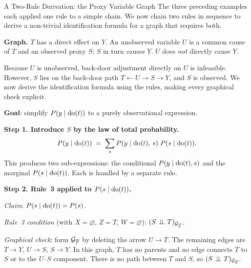 \documentclass[master.tex]{subfiles}
\begin{document}
\begin{example}{A Two-Rule Derivation: the Proxy Variable Graph}
\label{w3:ex:tworule}
The three preceding examples each applied one rule to a simple chain.
We now chain two rules in sequence to derive a non-trivial identification
formula for a graph that requires both.

\medskip
\noindent\textbf{Graph.}
$T$ has a direct effect on $Y$.  An unobserved variable $U$ is a common
cause of $T$ and an observed proxy $S$; $S$ in turn causes $Y$.
$U$ does \emph{not} directly cause $Y$.

\begin{center}
\end{center}

\noindent
Because $U$ is unobserved, back-door adjustment directly on $U$ is
infeasible.  However, $S$ lies on the back-door path $T \leftarrow U \to
S \to Y$, and $S$ is observed.  We now derive the identification formula
using the rules, making every graphical check explicit.

\medskip
\noindent\textbf{Goal}: simplify $P(y \mid \mathrm{do}(t))$ to a purely
observational expression.

\medskip
\noindent\textbf{Step 1.  Introduce $S$ by the law of total probability.}
\[
  P(y \mid \mathrm{do}(t))
  \;=\; \sum_s P(y \mid \mathrm{do}(t),\,s)\;P(s \mid \mathrm{do}(t)).
\]
This produces two sub-expressions: the conditional
$P(y \mid \mathrm{do}(t), s)$ and the marginal $P(s \mid \mathrm{do}(t))$.
Each is handled by a separate rule.

\medskip
\noindent\textbf{Step 2.  Rule~3 applied to $P(s \mid \mathrm{do}(t))$.}

\emph{Claim}: $P(s \mid \mathrm{do}(t)) = P(s)$.

\emph{Rule~3 condition} (with $X{=}\varnothing$, $Z{=}T$, $W{=}\varnothing$):
$(S \perp\!\!\!\perp T)_{\mathcal{G}_{\overline{T}}}$.

\emph{Graphical check}: form $\mathcal{G}_{\overline{T}}$ by deleting the arrow
$U \to T$.  The remaining edges are $T \to Y$, $U \to S$, $S \to Y$.
In this graph, $T$ has no parents and no edge connects $T$ to $S$ or to
the $U$--$S$ component.  There is no path between $T$ and $S$, so
$(S \perp\!\!\!\perp T)_{\mathcal{G}_{\overline{T}}}$. \checkmark


\end{example}
\end{document}
